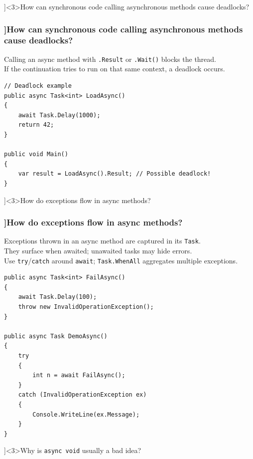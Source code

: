 \QuestionSlide[\CategoryBadge[PerfColor!20]{Async \& Threading}]<3>{How can synchronous code calling asynchronous methods cause deadlocks?}

\begin{frame}[fragile]
  \frametitle{\AnswerTitle[\CategoryBadge[OOPColor!20]{C\#} ]{How can synchronous code calling asynchronous methods cause deadlocks?}}

  {\footnotesize
  Calling an async method with \texttt{.Result} or \texttt{.Wait()} blocks the thread.\\
  If the continuation tries to run on that same context, a deadlock occurs.
  }

  \begin{verbatim}
// Deadlock example
public async Task<int> LoadAsync()
{
    await Task.Delay(1000);
    return 42;
}

public void Main()
{
    var result = LoadAsync().Result; // Possible deadlock!
}
  \end{verbatim}
\end{frame}

\QuestionSlide[\CategoryBadge[PerfColor!20]{Async \& Threading}]<3>{How do exceptions flow in async methods?}

\begin{frame}[fragile]
  \frametitle{\AnswerTitle[\CategoryBadge[OOPColor!20]{C\#} ]{How do exceptions flow in async methods?}}

  {\footnotesize
  Exceptions thrown in an async method are captured in its \texttt{Task}.\\
  They surface when awaited; unawaited tasks may hide errors.\\
  Use \texttt{try}/\texttt{catch} around \texttt{await}; \texttt{Task.WhenAll} aggregates multiple exceptions.
  }

  \begin{verbatim}
public async Task<int> FailAsync()
{
    await Task.Delay(100);
    throw new InvalidOperationException();
}

public async Task DemoAsync()
{
    try
    {
        int n = await FailAsync();
    }
    catch (InvalidOperationException ex)
    {
        Console.WriteLine(ex.Message);
    }
}
  \end{verbatim}
\end{frame}

\QuestionSlide[\CategoryBadge[PerfColor!20]{Async \& Threading}]<3>{Why is \texttt{async void} usually a bad idea?}

